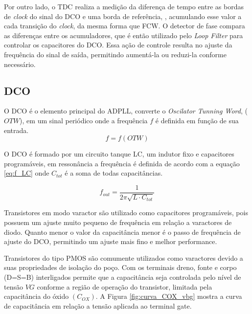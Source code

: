 Por outro lado, o TDC realiza a medição da diferença de tempo entre as bordas de \textit{clock} do sinal do DCO e uma borda de referência, , acumulando esse valor a cada transição do \textit{clock}, da mesma forma que FCW. O detector de fase compara as diferenças entre os acumuladores, que é então utilizado pelo \textit{Loop Filter} para controlar os capacitores do DCO. Essa ação de controle resulta no ajuste da frequência do sinal de saída, permitindo aumentá-la ou reduzi-la conforme necessário.

\subsection{DCO}
O DCO é o elemento principal do ADPLL, converte o \textit{Oscilator Tunning Word}, ($OTW$), em um sinal periódico onde a frequência $f$ é definida em função de sua entrada.
\begin{equation}
	f = f(OTW)
	\label{eq:f_OTW}
\end{equation}

O DCO é formado por um circuito tanque LC, um indutor fixo e capacitores programáveis, em ressonância a frequência é definida de acordo com a equação \ref{eq:f_LC} onde $C_{tot}$ é a soma de todas capacitâncias.

\begin{equation}
	f_{out} = \frac{1}{2 \pi \sqrt{L \cdot C_{tot}}}
	\label{eq:f_LC}
\end{equation}

Transistores em modo varactor são utilizado como capacitores programáveis, pois possuem um ajuste muito pequeno de frequência em relação a varactores de diodo. Quanto menor o valor da capacitância menor é o  passo de frequência de ajuste do DCO, permitindo um ajuste mais fino e melhor performance. 

Transistores do tipo PMOS são comumente utilizados como varactores devido a suas propriedades de isolação do poço. Com os terminais dreno, fonte e corpo (D=S=B) interligados permite que a capacitância seja controlada pelo nível de tensão $VG$ conforme a região de operação do transistor, limitada pela capacitância do óxido $(C_{OX})$. A Figura \ref{fig:curva_COX_vbg} mostra a curva de capacitância em relação a tensão aplicada ao terminal gate.

